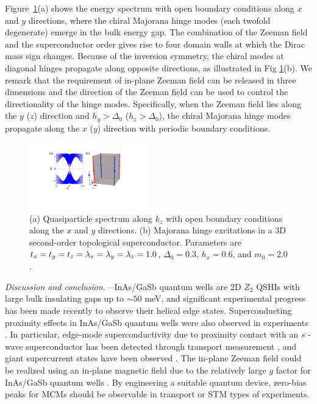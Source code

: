 \documentclass[twocolumn,prl,floatfix,citeautoscript,nofootinbib,superscriptaddress]{revtex4}
\begin{document}
Figure~\ref{Fig4}(a) shows the energy spectrum with open boundary conditions
along $x$ and $y$ directions, where the chiral Majorana hinge modes (each
twofold degenerate) emerge in the bulk energy gap. The combination of the
Zeeman field and the superconductor order gives rise to four domain walls at
which the Dirac mass sign changes. Because of the inversion symmetry, the
chiral modes at diagonal hinges propagate along opposite directions, as
illustrated in Fig \ref{Fig4}(b). We remark that the requirement of in-plane
Zeeman field can be released in three dimensions and the direction of the
Zeeman field can be used to control the directionality of the hinge modes.
Specifically, when the Zeeman field lies along the $y$ ($z$) direction and $%
h_{y}>\Delta _{0}$ ($h_{z}>\Delta _{0}$), the chiral Majorana hinge modes
propagate along the $x$ ($y$) direction with periodic boundary conditions.

\begin{figure}[tbp]
\centering\includegraphics[width=0.46\textwidth]{Fig4.pdf}
\caption{(a) Quasiparticle spectrum along $k_{z}$ with open boundary
conditions along the $x$ and $y$ directions. (b) Majorana hinge excitations
in a 3D second-order topological superconductor. Parameters are $%
t_{x}=t_{y}=t_{z}=\protect\lambda _{x}=\protect\lambda _{y}=\protect\lambda %
_{z}=1.0$, $\Delta _{0}=0.3$, $h_{x}=0.6$, and $m_{0}=2.0$.}
\label{Fig4}
\end{figure}

{\color{blue}\emph{Discussion and conclusion.---}}InAs/GaSb quantum wells
are 2D $Z_{2}$ QSHIs with large bulk insulating gaps up to $\sim 50$ meV,
and significant experimental progress has been made \cite%
{Du2017a,Nichele2017,Du2017b,Du2015} recently to observe their helical edge
states. Superconducting proximity effects in InAs/GaSb quantum wells were
also observed in experiments \cite{Yu2014,Pribiag2015,Shi2015}. In
particular, edge-mode superconductivity due to proximity contact with an $s$%
-wave superconductor has been detected through transport measurement \cite%
{Pribiag2015}, and giant supercurrent states have been observed \cite%
{Shi2015}. The in-plane Zeeman field could be realized using an in-plane
magnetic field due to the relatively large $g$ factor for InAs/GaSb quantum
wells \cite{Mu2016}. By engineering a suitable quantum device, zero-bias
peaks for MCMs should be observable in transport or STM types of experiments.
\end{document}
